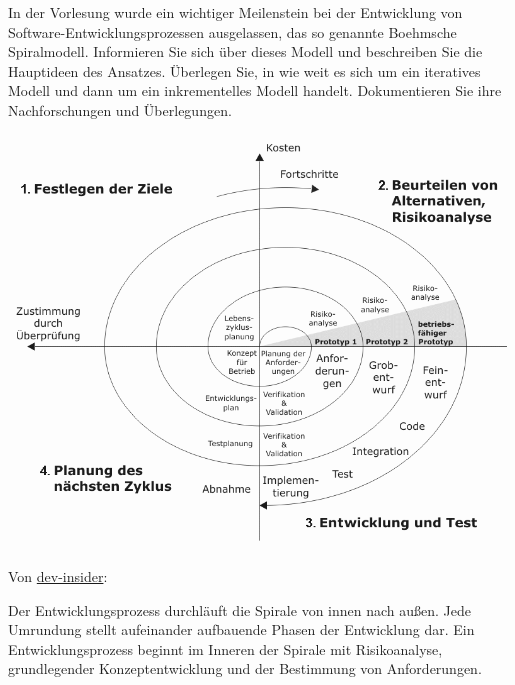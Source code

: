\documentclass{abgabe}
\begin{document}
\begin{questions}
    In der Vorlesung wurde ein wichtiger Meilenstein bei der Entwicklung von Software-Entwicklungspro\-zessen ausgelassen, das so genannte Boehmsche Spiralmodell. 
    Informieren Sie sich über dieses Modell und beschreiben Sie die Hauptideen des Ansatzes. 
    Überlegen Sie, in wie weit es sich um ein iteratives Modell und dann um ein inkrementelles Modell handelt. 
    Dokumentieren Sie ihre Nachforschungen und Überlegungen.
    \begin{solution}
        \begin{center}
            \href{https://cdn1.vogel.de/unsafe/fit-in/1000x0/images.vogel.de/vogelonline/bdb/1363200/1363291/original.jpg}{\includegraphics[width=1\textwidth]{Spiralmodel_nach_Boehm.png}}
        \end{center}
        
        Von \href{https://www.dev-insider.de/was-ist-das-spiralmodell-a-692581/}{dev-insider}:
        
        \begin{displayquote}
            Der Entwicklungsprozess durchläuft die Spirale von innen nach außen. 
            Jede Umrundung stellt aufeinander aufbauende Phasen der Entwicklung dar. 
            Ein Entwicklungsprozess beginnt im Inneren der Spirale mit Risikoanalyse, grundlegender Konzeptentwicklung und der Bestimmung von Anforderungen.
            

\end{displayquote}
\end{solution}
\end{questions}
\end{document}
